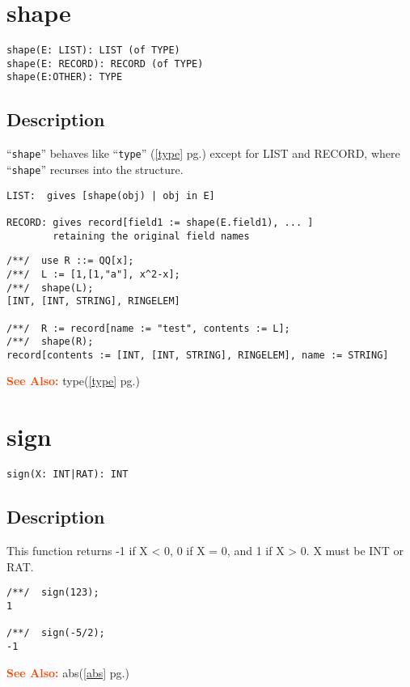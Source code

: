 \documentclass[a4paper]{mybook}
\newenvironment{command}{}{} %
\newcommand\SeeAlso{\par\textcolor{OrangeRed}{\textbf{\large See Also: }}}
\begin{document}
\section{shape}
\label{shape}
\begin{command} %


\begin{Verbatim}[label=syntax, rulecolor=\color{MidnightBlue},
frame=single]
shape(E: LIST): LIST (of TYPE)
shape(E: RECORD): RECORD (of TYPE)
shape(E:OTHER): TYPE
\end{Verbatim}


\subsection*{Description}

``\verb&shape&'' behaves like ``\verb&type&'' (\ref{type} pg.\pageref{type}) except for LIST and RECORD,
where ``\verb&shape&'' recurses into the structure.
\begin{verbatim}
LIST:  gives [shape(obj) | obj in E]

RECORD: gives record[field1 := shape(E.field1), ... ]
        retaining the original field names
\end{verbatim}
\begin{Verbatim}[label=example, rulecolor=\color{PineGreen}, frame=single]
/**/  use R ::= QQ[x];
/**/  L := [1,[1,"a"], x^2-x];
/**/  shape(L);
[INT, [INT, STRING], RINGELEM]

/**/  R := record[name := "test", contents := L];
/**/  shape(R);
record[contents := [INT, [INT, STRING], RINGELEM], name := STRING]
\end{Verbatim}


\SeeAlso %
  type(\ref{type} pg.\pageref{type})
\end{command} %

\section{sign}
\label{sign}
\begin{command} %


\begin{Verbatim}[label=syntax, rulecolor=\color{MidnightBlue},
frame=single]
sign(X: INT|RAT): INT
\end{Verbatim}


\subsection*{Description}

This function returns -1 if X < 0, 0 if X = 0, and 1 if X > 0.
X must be INT or RAT.
\begin{Verbatim}[label=example, rulecolor=\color{PineGreen}, frame=single]
/**/  sign(123);
1

/**/  sign(-5/2);
-1
\end{Verbatim}


\SeeAlso %
  abs(\ref{abs} pg.\pageref{abs})
\end{command} %
\end{document}
